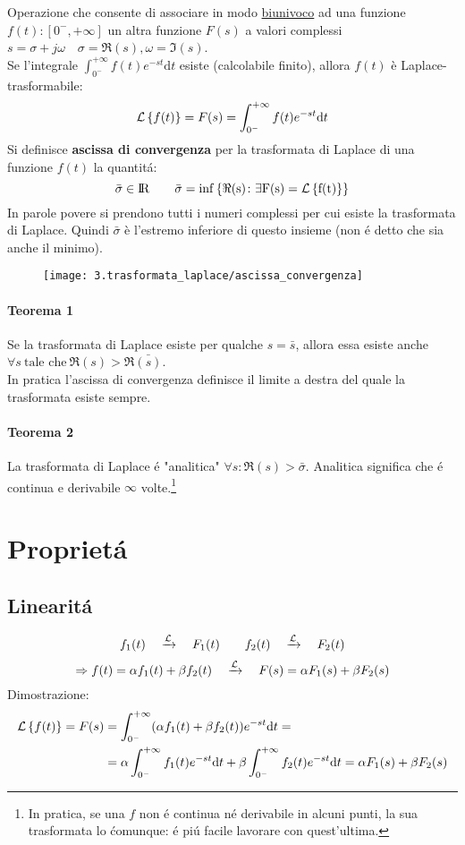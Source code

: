 \documentclass[../main.tex]{subfiles}
\begin{document}
	\label{sec:traformata_laplace}
	Operazione che consente di associare in modo \underline{biunivoco} ad una funzione $ f(t):\left[ 0^{-}, + \infty \right] $ un altra funzione $F(s)$ a valori complessi $ s = \sigma + j\omega \quad \sigma=\Re(s), \omega=\Im(s)$.\\
	\linebreak
	Se l'integrale $ \int_{0^{-}}^{+\infty}f(t)e^{-st} \mathrm{d}t $ esiste (calcolabile finito), allora $f(t)$ è Laplace-trasformabile:
	$$ \mathcal{L} \left\lbrace f(t) \right\rbrace = F(s) = \int_{0^{-}}^{+\infty} f(t) e^{- s t} \mathrm{d} t $$
	\linebreak
	Si definisce \textbf{ascissa di convergenza} per la trasformata di Laplace di una funzione $f(t)$ la quantit\'a:\\
	$$ \bar{\sigma} \in \rm I\!R \qquad \bar{\sigma} = inf\left\lbrace \Re{(s)} \colon \exists F(s) = \mathcal{L} \left\lbrace f(t) \right\rbrace \right\rbrace $$
	In parole povere si prendono tutti i numeri complessi per cui esiste la trasformata di Laplace. Quindi $ \bar{\sigma} $ è l'estremo inferiore di questo insieme (non \'e detto che sia anche il minimo).
	\begin{figure}[h!]
		\centering\texttt{[image: 3.trasformata\_laplace/ascissa\_convergenza]}
	\end{figure}
	\paragraph{Teorema 1} Se la trasformata di Laplace esiste per qualche $s=\bar{s}$, allora essa esiste anche $ \forall s\ \text{tale che}\ \Re{(s)} > \Re{\bar{(s)}} $.\\
	In pratica l'ascissa di convergenza definisce il limite a destra del quale la trasformata esiste sempre.
	\paragraph{Teorema 2} La trasformata di Laplace \'{e} "analitica" $ \forall s \colon \Re{(s)} > \bar{\sigma}$. Analitica significa che \'e continua e derivabile $\infty$ volte.\footnote{In pratica, se una $f$ non \'e continua n\'e derivabile in alcuni punti, la sua trasformata lo \' comunque: \'e pi\'u facile lavorare con quest'ultima.}
	\section{Propriet\'{a}}
	\subsection{Linearit\'{a}}
	\label{linear}
	$$ f_{1}(t) \quad \xrightarrow{\mathcal{L}} \quad F_{1}(t) \qquad f_{2}(t) \quad \xrightarrow{\mathcal{L}} \quad F_{2}(t) $$
	$$ \Rightarrow f(t)=\alpha f_{1}(t) + \beta f_{2}(t) \quad \xrightarrow{\mathcal{L}} \quad F(s)=\alpha F_{1}(s) + \beta F_{2}(s) $$
	Dimostrazione:
	\begin{align*}
		\mathcal{L} \left\lbrace f(t) \right\rbrace = F(s) &= \int_{0^{-}}^{+\infty} (\alpha f_{1}(t) + \beta f_{2}(t)) e^{- s t} \mathrm{d} t =\\
		&= \alpha \int_{0^{-}}^{+\infty} f_{1}(t) e^{- s t} \mathrm{d} t + \beta \int_{0^{-}}^{+\infty} f_{2}(t) e^{- s t} \mathrm{d} t = \alpha F_{1}(s) + \beta F_{2}(s)
	\end{align*}
\end{document}
